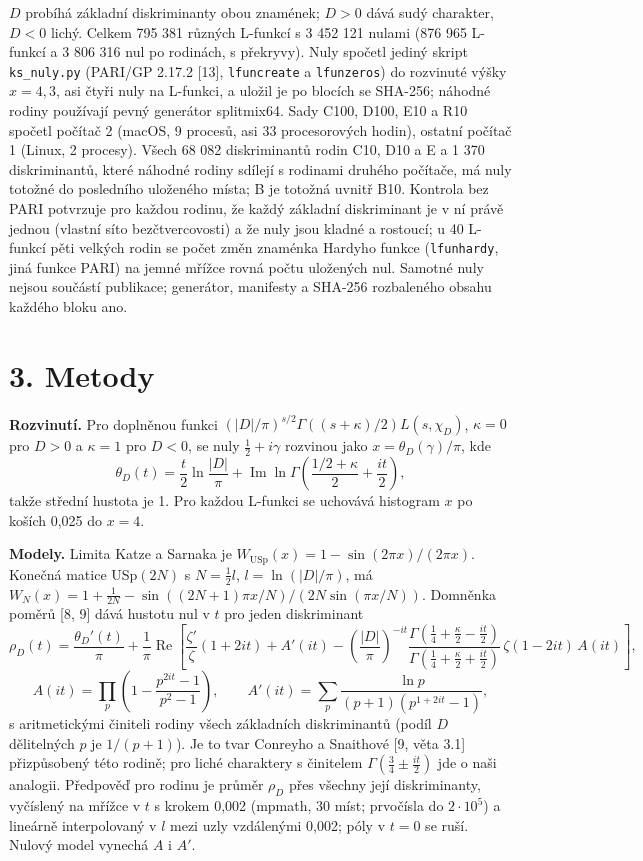 \documentclass[
  10pt,
]{article}
\begin{document}
\(D\) probíhá základní diskriminanty obou znamének; \(D > 0\) dává sudý
charakter, \(D < 0\) lichý. Celkem 795 381 různých L-funkcí s 3 452 121
nulami (876 965 L-funkcí a 3 806 316 nul po rodinách, s překryvy). Nuly
spočetl jediný skript \texttt{ks\_nuly.py} (PARI/GP 2.17.2 {[}13{]},
\texttt{lfuncreate} a \texttt{lfunzeros}) do rozvinuté výšky
\(x = 4{,}3\), asi čtyři nuly na L-funkci, a uložil je po blocích se
SHA-256; náhodné rodiny používají pevný generátor splitmix64. Sady C100,
D100, E10 a R10 spočetl počítač 2 (macOS, 9 procesů, asi 33
procesorových hodin), ostatní počítač 1 (Linux, 2 procesy). Všech 68 082
diskriminantů rodin C10, D10 a E a 1 370 diskriminantů, které náhodné
rodiny sdílejí s rodinami druhého počítače, má nuly totožné do
posledního uloženého místa; B je totožná uvnitř B10. Kontrola bez PARI
potvrzuje pro každou rodinu, že každý základní diskriminant je v ní
právě jednou (vlastní síto bezčtvercovosti) a že nuly jsou kladné a
rostoucí; u 40 L-funkcí pěti velkých rodin se počet změn znaménka
Hardyho funkce (\texttt{lfunhardy}, jiná funkce PARI) na jemné mřížce
rovná počtu uložených nul. Samotné nuly nejsou součástí publikace;
generátor, manifesty a SHA-256 rozbaleného obsahu každého bloku ano.

\hypertarget{metody}{%
\section{3. Metody}\label{metody}}

\textbf{Rozvinutí.} Pro doplněnou funkci
\((|D|/\pi)^{s/2}\Gamma((s + \kappa)/2) L(s, \chi_D)\), \(\kappa = 0\)
pro \(D > 0\) a \(\kappa = 1\) pro \(D < 0\), se nuly
\(\frac12 + i\gamma\) rozvinou jako \(x = \theta_D(\gamma)/\pi\), kde
\[\theta_D(t) = \frac{t}{2}\ln\frac{|D|}{\pi} + \operatorname{Im}\ln\Gamma\!\left(\frac{1/2 + \kappa}{2} + \frac{it}{2}\right),\]
takže střední hustota je 1. Pro každou L-funkci se uchovává histogram
\(x\) po koších 0,025 do \(x = 4\).

\textbf{Modely.} Limita Katze a Sarnaka je
\(W_{\mathrm{USp}}(x) = 1 - \sin(2\pi x)/(2\pi x)\). Konečná matice
USp\((2N)\) s \(N = \frac12 l\), \(l = \ln(|D|/\pi)\), má
\(W_N(x) = 1 + \frac{1}{2N} - \sin((2N + 1)\pi x/N)/(2N\sin(\pi x/N))\).
Domněnka poměrů {[}8, 9{]} dává hustotu nul v \(t\) pro jeden
diskriminant
\[\rho_D(t) = \frac{\theta_D'(t)}{\pi} + \frac{1}{\pi}\operatorname{Re}\left[\frac{\zeta'}{\zeta}(1 + 2it) + A'(it) - \left(\frac{|D|}{\pi}\right)^{-it}\frac{\Gamma(\frac14 + \frac\kappa2 - \frac{it}{2})}{\Gamma(\frac14 + \frac\kappa2 + \frac{it}{2})}\,\zeta(1 - 2it)\,A(it)\right],\]
\[A(it) = \prod_p\left(1 - \frac{p^{2it} - 1}{p^2 - 1}\right), \qquad A'(it) = \sum_p \frac{\ln p}{(p + 1)(p^{1 + 2it} - 1)},\]
s aritmetickými činiteli rodiny všech základních diskriminantů (podíl
\(D\) dělitelných \(p\) je \(1/(p + 1)\)). Je to tvar Conreyho a
Snaithové {[}9, věta 3.1{]} přizpůsobený této rodině; pro liché
charaktery s činitelem \(\Gamma(\frac34 \pm \frac{it}{2})\) jde o naši
analogii. Předpověď pro rodinu je průměr \(\rho_D\) přes všechny její
diskriminanty, vyčíslený na mřížce v \(t\) s krokem 0,002 (mpmath, 30
míst; prvočísla do \(2\cdot10^5\)) a lineárně interpolovaný v \(l\) mezi
uzly vzdálenými 0,002; póly v \(t = 0\) se ruší. Nulový model vynechá
\(A\) i \(A'\).
\end{document}
